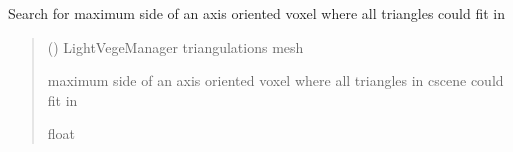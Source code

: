 \documentclass[letterpaper,10pt,english]{sphinxmanual}
\begin{document}

\begin{fulllineitems}
\label{\detokenize{reference:trianglesmesh.compute_trilenght_max}}
\pysigstartsignatures
{}
\pysigstopsignatures
\sphinxAtStartPar
Search for maximum side of an axis oriented voxel where all triangles could fit in
\begin{quote}\begin{description}
\sphinxAtStartPar
{} () \textendash{} LightVegeManager triangulations mesh

\sphinxAtStartPar
maximum side of an axis oriented voxel where all triangles in cscene could fit in

\sphinxAtStartPar
float

\end{description}\end{quote}

\end{fulllineitems}


\begin{fulllineitems}
\label{\detokenize{reference:trianglesmesh.isatriangle}}
\pysigstartsignatures
{}
\pysigstopsignatures
\end{fulllineitems}

\end{document}
